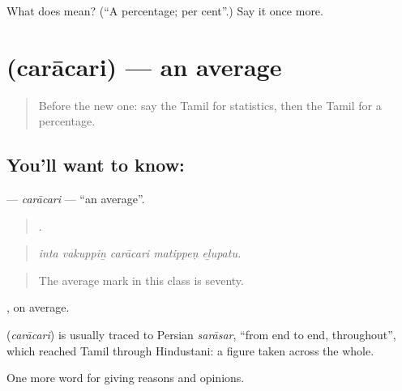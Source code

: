 \begin{tcolorbox}[breakable,colback=teal!4,colframe=teal!35!black,title={Before you move on}]
What does  mean? (\textquotedblleft{}A percentage; per cent\textquotedblright{}.) Say it once more.
\end{tcolorbox}
\section[\texorpdfstring{\ta{சராசரி} (carācari)}{சராசரி (carācari)}]{ (carācari) — an average}

\label{lesson:TA-C363-caracari}



\begin{quote}
Before the new one: say the Tamil for statistics, then the Tamil for a percentage.
\end{quote}

\subsection*{You'll want to know: }
\textbf{} — \emph{carācari} — \textquotedblleft{}an average\textquotedblright{}.

\begin{quote}
    .
\end{quote}

\begin{quote}
\emph{inta vakuppiṉ carācari matippeṇ eḻupatu.}
\end{quote}

\begin{quote}
The average mark in this class is seventy.
\end{quote}

, on average.

\begin{cousinweb}
\textbf{} (\emph{carācari}) is usually traced to Persian \emph{sarāsar}, \textquotedblleft{}from end to end, throughout\textquotedblright{}, which reached Tamil through Hindustani: a figure taken across the whole.
\end{cousinweb}

\begin{grammarlens}[title={What you've built}]
One more word for giving reasons and opinions.
\end{grammarlens}

